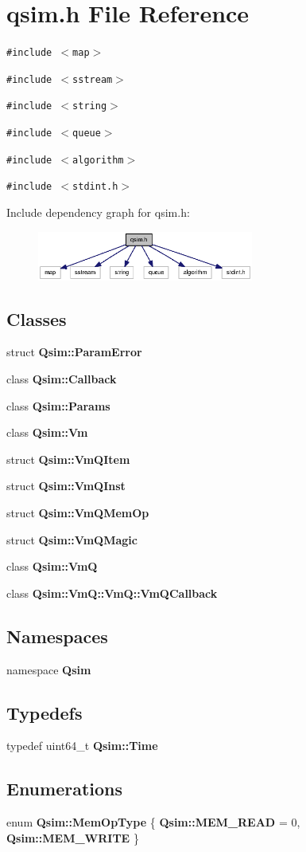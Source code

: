 \section{qsim.h File Reference}
\label{qsim_8h}
{\tt \#include $<$map$>$}\par
{\tt \#include $<$sstream$>$}\par
{\tt \#include $<$string$>$}\par
{\tt \#include $<$queue$>$}\par
{\tt \#include $<$algorithm$>$}\par
{\tt \#include $<$stdint.h$>$}\par


Include dependency graph for qsim.h:\nopagebreak
\begin{figure}[H]
\begin{center}
\leavevmode
\includegraphics[width=202pt]{qsim_8h__incl}
\end{center}
\end{figure}
\subsection*{Classes}
\begin{CompactItemize}
\item 
struct {\bf Qsim::ParamError}
\item 
class {\bf Qsim::Callback}
\item 
class {\bf Qsim::Params}
\item 
class {\bf Qsim::Vm}
\item 
struct {\bf Qsim::VmQItem}
\item 
struct {\bf Qsim::VmQInst}
\item 
struct {\bf Qsim::VmQMemOp}
\item 
struct {\bf Qsim::VmQMagic}
\item 
class {\bf Qsim::VmQ}
\item 
class {\bf Qsim::VmQ::VmQ::VmQCallback}
\end{CompactItemize}
\subsection*{Namespaces}
\begin{CompactItemize}
\item 
namespace {\bf Qsim}
\end{CompactItemize}
\subsection*{Typedefs}
\begin{CompactItemize}
\item 
typedef uint64\_\-t {\bf Qsim::Time}
\end{CompactItemize}
\subsection*{Enumerations}
\begin{CompactItemize}
\item 
enum {\bf Qsim::MemOpType} \{ {\bf Qsim::MEM\_\-READ} =  0, 
{\bf Qsim::MEM\_\-WRITE}
 \}
\end{CompactItemize}
